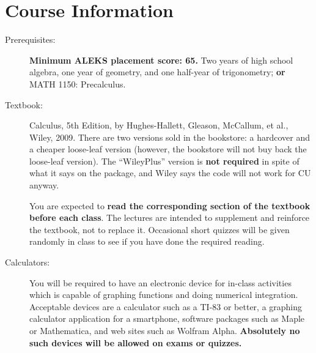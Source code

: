 \documentclass[11pt]{article}
\begin{document}
\section*{Course Information}
\begin{description}

\item[Prerequisites:] \textbf{Minimum ALEKS placement score: 65.}  Two
  years of high school algebra, one year of geometry, and one
  half-year of trigonometry; \textbf{or} MATH 1150: Precalculus.

\item[Textbook:] Calculus, 5th Edition, by Hughes-Hallett, Gleason,
  McCallum, et al., Wiley, 2009.  There are two versions sold in the
  bookstore: a hardcover and a cheaper loose-leaf version (however, the
  bookstore will not buy back the loose-leaf version). The
  ``WileyPlus'' version is \textbf{not required} in spite of what it
  says on the package, and Wiley says the code will not work for CU
  anyway.

  You are expected to \textbf{read the corresponding section of the
    textbook before each class}. The lectures are intended to
  supplement and reinforce the textbook, not to replace it. Occasional
  short quizzes will be given randomly in class to see if you have
  done the required reading.

\item[Calculators:] You will be required to have an electronic device
  for in-class activities which is capable of graphing functions and
  doing numerical integration. Acceptable devices are a calculator
  such as a TI-83 or better, a graphing calculator application for a
  smartphone, software packages such as Maple or Mathematica, and web
  sites such as Wolfram Alpha.  \textbf{Absolutely no such devices
    will be allowed on exams or quizzes.}


\end{description}
\end{document}
